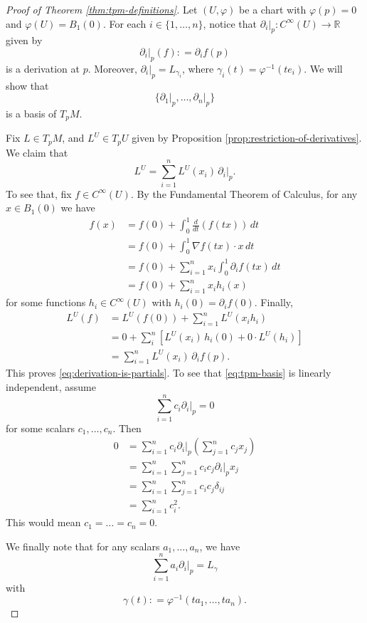 \documentclass{ximera}
\begin{document}
    \begin{proof}[Proof of Theorem \ref{thm:tpm-definitions}]  
        Let $(U, \varphi)$ be a chart with $\varphi (p) = 0$ and $\varphi (U) = B_1(0)$.  For each $i \in \{ 1, \ldots , n \}$, notice that $\partial _i \vert _p : C^{\infty}(U) \to \mathbb{R}$ given by 
        \[      \partial_i \vert _p (f) : =  \partial _i  f  (p)      \]
        is a derivation at $p$. Moreover, $\partial_i \vert _p = L _{\gamma_i}$, where $\gamma_i (t) = \varphi ^{-1} ( t e_i)$. We will show that 
        \begin{equation}\label{eq:tpm-basis}
              \{   \partial_1 \vert _p , \ldots,   \partial_n \vert _p    \}      
        \end{equation}
        is a basis of $T_pM$. 
        
        Fix $L \in T_pM$, and $L^U \in T_pU$ given by Proposition \ref{prop:restriction-of-derivatives}. We claim that 
        \begin{equation}\label{eq:derivation-is-partials}
            L ^U = \sum_{i = 1} ^ n  L ^U ( x_i )\,  \partial _i \vert _p . 
        \end{equation}
       To see that, fix $f \in C^{\infty } (U)$. By the Fundamental Theorem of Calculus, for any $x \in B_1(0)$ we have
       \begin{align*}
           f(x) & = f(0) + \int _0 ^1 \frac{d}{dt} (f (tx)) \, dt \\
           & = f(0) + \int_0 ^1 \nabla f (tx) \cdot x \, dt \\
           & = f(0) + \sum_{i = 1}^n x_i \int_0^1  \partial _i f(tx) \, dt \\
           & = f(0) + \sum_{i = 1}^n x_i  h_i (x)
       \end{align*}
       for some functions $h_i \in C^{\infty} (U)$ with $h_i (0) = \partial_if (0)$.  Finally, 
    \begin{align*}
        L ^U (f) & = L^U (f(0)) +\sum_{i = 1}^n L ^U \left(  x_i h_i    \right) \\
        & = 0 + \sum _i ^n \left[   L ^U( x_i ) \, h_i (0)  + 0   \cdot  L^U (h_i)    \right] \\
         &= \sum _{i = 1} ^n L^U (x_i) \, \partial_i  f (p).
    \end{align*}
    This proves \eqref{eq:derivation-is-partials}.     To see that \eqref{eq:tpm-basis} is linearly independent, assume  
    \[ \sum_{i = 1} ^n c_i \partial_i \vert _p  = 0\] 
    for some scalars $c_1, \ldots , c_n$. Then
    \begin{align*}
        0 & =  \sum_{i = 1} ^n c_i \partial_i \vert _p \left( \sum_{j =1 }^n c_j x_j \right)  \\
        & =  \sum_{i = 1} ^n  \sum_{j =1 }^n c_i c_j  \partial_i \vert _p x_j  \\
        & = \sum_{i = 1} ^n  \sum_{j =1 }^n c_i c_j \delta_{ij} \\
        & = \sum _{i = 1 }^n c_i ^2 .
    \end{align*}
    This would mean $c_1 = \ldots = c_n = 0$. 
    
      We finally note that for any scalars $a_1, \ldots , a_n$, we have 
      \[ \sum_{i = 1} ^n a_i \partial_i \vert _p  =  L_{\gamma} \] 
      with 
    \[  \gamma (t) : = \varphi ^{-1} (  ta_1, \ldots , ta_n) .   \]
    \end{proof}    
        
\end{document}
